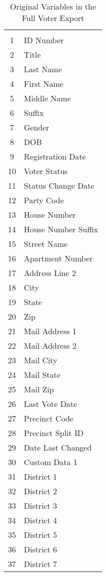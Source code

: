 
\begin{table}[!htbp] \centering 
  \caption{Original Variables in the Full Voter Export} 
  \label{fvevariables} 
\small 
\begin{tabular}{@{\extracolsep{5pt}} cl} 
\\[-1.8ex]\hline 
\hline \\[-1.8ex] 
1 & ID Number \\ 
2 & Title \\ 
3 & Last Name \\ 
4 & First Name \\ 
5 & Middle Name \\ 
6 & Suffix \\ 
7 & Gender \\ 
8 & DOB \\ 
9 & Registration Date \\ 
10 & Voter Status \\ 
11 & Status Change Date \\ 
12 & Party Code \\ 
13 & House Number \\ 
14 & House Number Suffix \\ 
15 & Street Name \\ 
16 & Apartment Number \\ 
17 & Address Line 2 \\ 
18 & City \\ 
19 & State \\ 
20 & Zip \\ 
21 & Mail Address 1 \\ 
22 & Mail Address 2 \\ 
23 & Mail City \\ 
24 & Mail State \\ 
25 & Mail Zip \\ 
26 & Last Vote Date \\ 
27 & Precinct Code \\ 
28 & Precinct Split ID \\ 
29 & Date Last Changed \\ 
30 & Custom Data 1 \\ 
31 & District 1 \\ 
32 & District 2 \\ 
33 & District 3 \\ 
34 & District 4 \\ 
35 & District 5 \\ 
36 & District 6 \\ 
37 & District 7 \\ 

\end{tabular}
\end{table}
